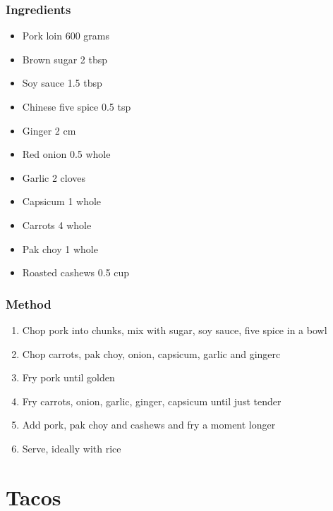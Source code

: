 \documentclass[]{article}
\begin{document}
\subsubsection*{\Large Ingredients}
\begin{multicols}{2}
\begin{itemize}
 \item Pork loin \hfill 600 grams
 \item Brown sugar \hfill 2 tbsp
 \item Soy sauce \hfill 1.5 tbsp
 \item Chinese five spice \hfill 0.5 tsp
 \item Ginger \hfill 2 cm
 \item Red onion \hfill 0.5 whole
 \item Garlic \hfill 2 cloves
 \item Capsicum \hfill 1 whole
 \item Carrots \hfill 4 whole
 \item Pak choy \hfill 1 whole
 \item Roasted cashews \hfill 0.5 cup
\end{itemize}
\end{multicols}
\subsubsection*{\Large Method}
\begin{enumerate}[font=\huge\color{accent}]
	\item Chop pork into chunks, mix with sugar, soy sauce, five spice in a bowl
	\item Chop carrots, pak choy, onion, capsicum, garlic and gingerc
	\item Fry pork until golden
	\item Fry carrots, onion, garlic, ginger, capsicum until just tender
	\item Add pork, pak choy and cashews and fry a moment longer
	\item Serve, ideally with rice
\end{enumerate}
\newpage
{}
\section*{\center\Huge\color{accent}Tacos}
\label{cat:Tacos}
\label{rec:Steak Tacos}
\end{document}

